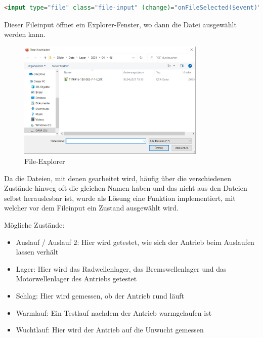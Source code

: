 \begin{lstlisting}[language=HTML, caption={Fileinput}]
    <input type="file" class="file-input" (change)="onFileSelected($event)">
\end{lstlisting}

Dieser Fileinput öffnet ein Explorer-Fenster, wo dann die Datei ausgewählt werden kann.

\begin{figure}[H]
    \centering
    \includegraphics[width=0.80\textwidth]{pics/filexplorer.PNG}
    \caption{File-Explorer}
    \label{fig:fileexplorer}
\end{figure}

Da die Dateien, mit denen gearbeitet wird, häufig über die verschiedenen Zustände hinweg oft die gleichen Namen haben und das nicht 
aus den Dateien selbst herauslesbar ist, wurde als Lösung eine Funktion implementiert, mit welcher vor dem Fileinput ein Zustand 
ausgewählt wird.

Mögliche Zustände:
\begin{itemize}
    \item Auslauf / Auslauf 2: Hier wird getestet, wie sich der Antrieb beim Auslaufen lassen verhält
    \item Lager: Hier wird das Radwellenlager, das Bremswellenlager und das Motorwellenlager des Antriebs getestet
    \item Schlag: Hier wird gemessen, ob der Antrieb rund läuft
    \item Warmlauf: Ein Testlauf nachdem der Antrieb warmgelaufen ist
    \item Wuchtlauf: Hier wird der Antrieb auf die Unwucht gemessen
\end{itemize}

